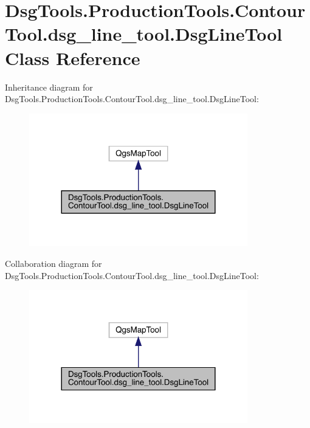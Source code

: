 \hypertarget{class_dsg_tools_1_1_production_tools_1_1_contour_tool_1_1dsg__line__tool_1_1_dsg_line_tool}{}\section{Dsg\+Tools.\+Production\+Tools.\+Contour\+Tool.\+dsg\+\_\+line\+\_\+tool.\+Dsg\+Line\+Tool Class Reference}
\label{class_dsg_tools_1_1_production_tools_1_1_contour_tool_1_1dsg__line__tool_1_1_dsg_line_tool}


Inheritance diagram for Dsg\+Tools.\+Production\+Tools.\+Contour\+Tool.\+dsg\+\_\+line\+\_\+tool.\+Dsg\+Line\+Tool\+:
\nopagebreak
\begin{figure}[H]
\begin{center}
\leavevmode
\includegraphics[width=269pt]{class_dsg_tools_1_1_production_tools_1_1_contour_tool_1_1dsg__line__tool_1_1_dsg_line_tool__inherit__graph}
\end{center}
\end{figure}


Collaboration diagram for Dsg\+Tools.\+Production\+Tools.\+Contour\+Tool.\+dsg\+\_\+line\+\_\+tool.\+Dsg\+Line\+Tool\+:
\nopagebreak
\begin{figure}[H]
\begin{center}
\leavevmode
\includegraphics[width=269pt]{class_dsg_tools_1_1_production_tools_1_1_contour_tool_1_1dsg__line__tool_1_1_dsg_line_tool__coll__graph}
\end{center}
\end{figure}
